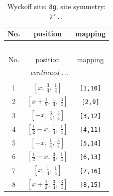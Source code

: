 \documentclass[fleqn,8pt]{jsarticle}
\begin{document}
\renewcommand{\arraystretch}{1.2}
\begin{longtable}{ccc}
\caption{Wyckoff site: {\tt 8g}, site symmetry: {\tt 2'..}}
 \\
 \hline \hline
No. & position & mapping \\ \hline \endfirsthead

\multicolumn{2}{l}{\tablename\ \thetable{}} \\
 \hline \hline
No. & position & mapping \\ \hline \endhead

 \hline \hline
\multicolumn{2}{r}{\footnotesize\it continued ...} \\ \endfoot

 \hline \hline
\multicolumn{2}{r}{} \\ \endlastfoot

1 & $\left[ x,\, \frac{3}{4},\, \frac{1}{4} \right]$ & {\tt [1,10]} \\ \hline
2 & $\left[ x + \frac{1}{2},\, \frac{1}{4},\, \frac{3}{4} \right]$ & {\tt [2,9]} \\ \hline
3 & $\left[ - x,\, \frac{3}{4},\, \frac{3}{4} \right]$ & {\tt [3,12]} \\ \hline
4 & $\left[ \frac{1}{2} - x,\, \frac{1}{4},\, \frac{1}{4} \right]$ & {\tt [4,11]} \\ \hline
5 & $\left[ - x,\, \frac{1}{4},\, \frac{3}{4} \right]$ & {\tt [5,14]} \\ \hline
6 & $\left[ \frac{1}{2} - x,\, \frac{3}{4},\, \frac{1}{4} \right]$ & {\tt [6,13]} \\ \hline
7 & $\left[ x,\, \frac{1}{4},\, \frac{1}{4} \right]$ & {\tt [7,16]} \\ \hline
8 & $\left[ x + \frac{1}{2},\, \frac{3}{4},\, \frac{3}{4} \right]$ & {\tt [8,15]} \\
\end{longtable}
\renewcommand{\arraystretch}{1.2}
\end{document}
